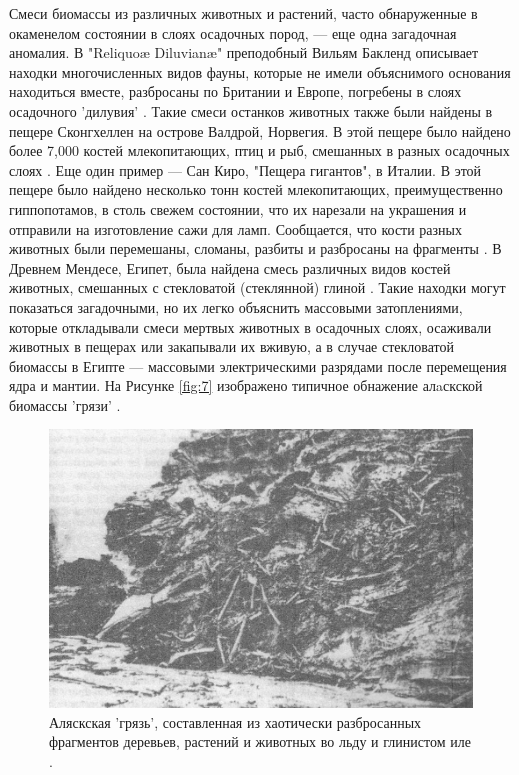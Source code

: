 \documentclass[10pt,twocolumn,letterpaper]{article}
\begin{document}
Смеси биомассы из различных животных и растений, часто обнаруженные в окаменелом состоянии в слоях осадочных пород, — еще одна загадочная аномалия. В "Reliquoæ Diluvianæ" преподобный Вильям Бакленд описывает находки многочисленных видов фауны, которые не имели объяснимого основания находиться вместе, разбросаны по Британии и Европе, погребены в слоях осадочного 'дилувия' \cite{58}. Такие смеси останков животных также были найдены в пещере Сконгхеллен на острове Валдрой, Норвегия. В этой пещере было найдено более 7,000 костей млекопитающих, птиц и рыб, смешанных в разных осадочных слоях \cite{59}. Еще один пример — Сан Киро, "Пещера гигантов", в Италии. В этой пещере было найдено несколько тонн костей млекопитающих, преимущественно гиппопотамов, в столь свежем состоянии, что их нарезали на украшения и отправили на изготовление сажи для ламп. Сообщается, что кости разных животных были перемешаны, сломаны, разбиты и разбросаны на фрагменты \cite{60,61}. В Древнем Мендесе, Египет, была найдена смесь различных видов костей животных, смешанных с стекловатой (стеклянной) глиной \cite{57}. Такие находки могут показаться загадочными, но их легко объяснить массовыми затоплениями, которые откладывали смеси мертвых животных в осадочных слоях, осаживали животных в пещерах или закапывали их вживую, а в случае стекловатой биомассы в Египте — массовыми электрическими разрядами после перемещения ядра и мантии. На Рисунке \ref{fig:7} изображено типичное обнажение алaскской биомассы 'грязи' \cite{56}.

\begin{figure}[t]
\begin{center}
   \includegraphics[width=1\linewidth]{muck-crop.jpeg}
\end{center}
   \caption{Аляскская 'грязь', составленная из хаотически разбросанных фрагментов деревьев, растений и животных во льду и глинистом иле \cite{146}.}
\label{fig:7}
\label{fig:onecol}
\end{figure}
\end{document}
